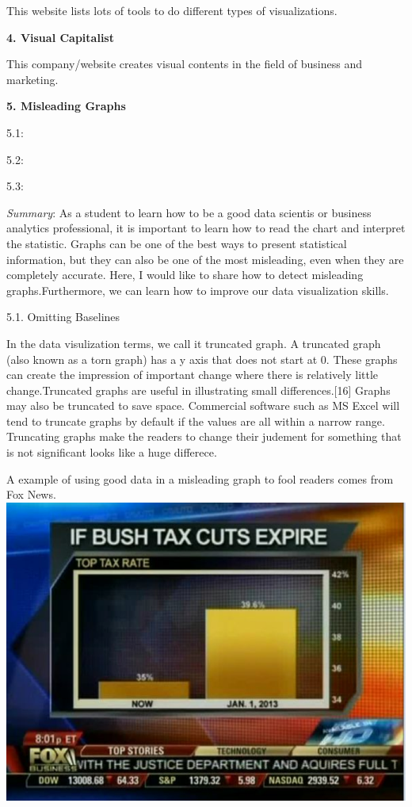 \documentclass[]{book}
\theoremstyle{definition}
\theoremstyle{definition}
\theoremstyle{definition}
\theoremstyle{remark}
\begin{document}
This website lists lots of tools to do different types of
visualizations.

\textbf{4. Visual Capitalist} \citep{visual_cap}

This company/website creates visual contents in the field of business
and marketing.

\textbf{5. Misleading Graphs}

5.1: \citep{venngage}

5.2: \citep{wiki_mislead}

5.3: \citep{data_analysis_deception}

\emph{Summary}: As a student to learn how to be a good data scientis or
business analytics professional, it is important to learn how to read
the chart and interpret the statistic. Graphs can be one of the best
ways to present statistical information, but they can also be one of the
most misleading, even when they are completely accurate. Here, I would
like to share how to detect misleading graphs.Furthermore, we can learn
how to improve our data visualization skills.

5.1. Omitting Baselines

In the data visulization terms, we call it truncated graph. A truncated
graph (also known as a torn graph) has a y axis that does not start at
0. These graphs can create the impression of important change where
there is relatively little change.Truncated graphs are useful in
illustrating small differences.{[}16{]} Graphs may also be truncated to
save space. Commercial software such as MS Excel will tend to truncate
graphs by default if the values are all within a narrow range.
Truncating graphs make the readers to change their judement for
something that is not significant looks like a huge differece.

A example of using good data in a misleading graph to fool readers comes
from Fox News. \includegraphics{images/1.png}
\end{document}
